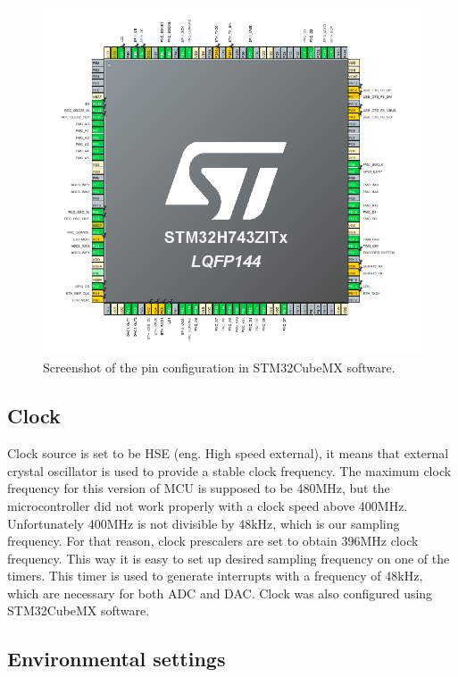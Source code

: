 \documentclass[a4paper,twoside,12pt]{book}
\begin{document}
\begin{figure}[H]
    \centering
    \includegraphics[width=\textwidth]{images/pin_overview}
    \caption{Screenshot of the pin configuration in STM32CubeMX software.}
    \label{fig:pins}
\end{figure}

\subsection{Clock}

Clock source is set to be HSE (eng. High speed external),
it means that external crystal oscillator is used to
provide a stable clock frequency.
The maximum clock frequency for this version of MCU is supposed to be 480MHz,
but the microcontroller did not work properly with a clock speed above 400MHz.
Unfortunately 400MHz is not divisible by 48kHz, which is our sampling frequency.
For that reason, clock prescalers are set to obtain 396MHz clock frequency.
This way it is easy to set up desired sampling frequency on one of the timers.
This timer is used to generate interrupts with a frequency of 48kHz,
which are necessary for both ADC and DAC.
Clock was also configured using STM32CubeMX software.

\subsection{Environmental settings}
\end{document}
